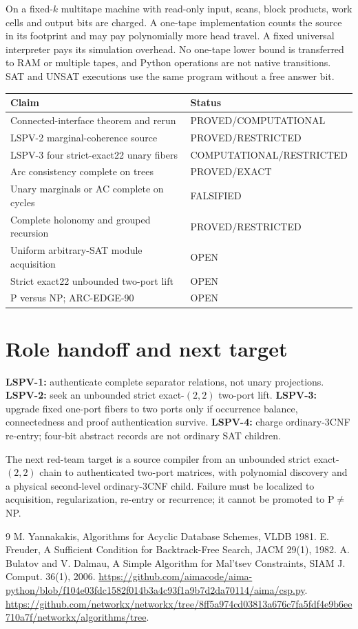 \documentclass[11pt]{article}
\begin{document}
On a fixed-$k$ multitape machine with read-only input, scans, block products,
work cells and output bits are charged. A one-tape implementation counts the
source in its footprint and may pay polynomially more head travel. A fixed
universal interpreter pays its simulation overhead. No one-tape lower bound is
transferred to RAM or multiple tapes, and Python operations are not native
transitions. SAT and UNSAT executions use the same program without a free
answer bit.

\begin{center}\small
\begin{tabular}{p{.57\linewidth}p{.23\linewidth}}
\toprule Claim & Status\\\midrule
Connected-interface theorem and rerun & PROVED/COMPUTATIONAL\\
LSPV-2 marginal-coherence source & PROVED/RESTRICTED\\
LSPV-3 four strict-exact22 unary fibers & COMPUTATIONAL/RESTRICTED\\
Arc consistency complete on trees & PROVED/EXACT\\
Unary marginals or AC complete on cycles & FALSIFIED\\
Complete holonomy and grouped recursion & PROVED/RESTRICTED\\
Uniform arbitrary-SAT module acquisition & OPEN\\
Strict exact22 unbounded two-port lift & OPEN\\
P versus NP; ARC-EDGE-90 & OPEN\\\bottomrule
\end{tabular}
\end{center}

\section{Role handoff and next target}
\textbf{LSPV-1:} authenticate complete separator relations, not unary
projections. \textbf{LSPV-2:} seek an unbounded strict exact-$(2,2)$ two-port
lift. \textbf{LSPV-3:} upgrade fixed one-port fibers to two ports only if
occurrence balance, connectedness and proof authentication survive.
\textbf{LSPV-4:} charge ordinary-3CNF re-entry; four-bit abstract records are
not ordinary SAT children.

The next red-team target is a source compiler from an unbounded strict
exact-$(2,2)$ chain to authenticated two-port matrices, with polynomial
discovery and a physical second-level ordinary-3CNF child. Failure must be
localized to acquisition, regularization, re-entry or recurrence; it cannot
be promoted to P$\ne$NP.

\begin{thebibliography}{9}
 M. Yannakakis, Algorithms for Acyclic Database Schemes, VLDB 1981.
 E. Freuder, A Sufficient Condition for Backtrack-Free Search,
JACM 29(1), 1982.
 A. Bulatov and V. Dalmau, A Simple Algorithm for Mal'tsev
Constraints, SIAM J. Comput. 36(1), 2006.
\url{https://github.com/aimacode/aima-python/blob/f104e03fdc1582f014b3a4c93f1a9b7d2da70114/aima/csp.py}.
\url{https://github.com/networkx/networkx/tree/8ff5a974cd03813a676c7fa5fdf4e9b6ee710a7f/networkx/algorithms/tree}.
\end{thebibliography}
\end{document}
